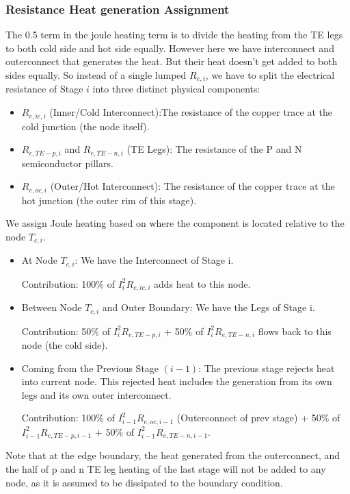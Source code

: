 \documentclass[10pt,a4paper,twocolumn]{article}
\begin{document}
\subsubsection{Resistance Heat generation Assignment}

The 0.5 term in the joule heating term is to divide the heating from the TE legs to both cold side and hot side equally. However here we have interconnect and outerconnect that generates the heat. But their heat doesn't get added to both sides equally. So instead of a single lumped $R_{e,i}$, we have to  split the electrical resistance of Stage $i$ into three distinct physical components:

\begin{itemize}
  \item $R_{e,ic,i}$ (Inner/Cold Interconnect):The resistance of the copper trace at the cold junction (the node itself).
  \item $R_{e,TE-p,i}$ and $R_{e,TE-n,i}$ (TE Legs): The resistance of the P and N semiconductor pillars.
  \item $R_{e,oc,i}$ (Outer/Hot Interconnect): The resistance of the copper trace at the hot junction (the outer rim of this stage).
\end{itemize}

We assign Joule heating based on where the component is located relative to the node $T_{c,i}$.
\begin{itemize}
  \item At Node $T_{c,i}$: We have the Interconnect of Stage i.

        Contribution: 100\% of $I_i^2 R_{e,ic,i}$ adds heat to this node.

  \item  Between Node $T_{c,i}$ and Outer Boundary: We have the Legs of Stage i.

        Contribution: 50\% of $I_i^2 R_{e,TE-p,i}$ + 50\% of $I_i^2 R_{e,TE-n,i}$ flows back to this node (the cold side).

  \item  Coming from the Previous Stage $(i-1)$: The previous stage rejects heat into  current node. This rejected heat includes the generation from its own legs and its own outer interconnect.

        Contribution: 100\% of $I_{i-1}^2 R_{e,oc,i-1}$ (Outerconnect of prev stage) + 50\% of $I_{i-1}^2 R_{e,TE-p,i-1}$ + 50\% of $I_{i-1}^2 R_{e,TE-n,i-1}$.
\end{itemize}

Note that at the edge boundary, the heat generated from the outerconnect, and the half of p and n TE leg heating of the last stage will not be added to any node, as it is assumed to be dissipated to the boundary condition.
\end{document}
